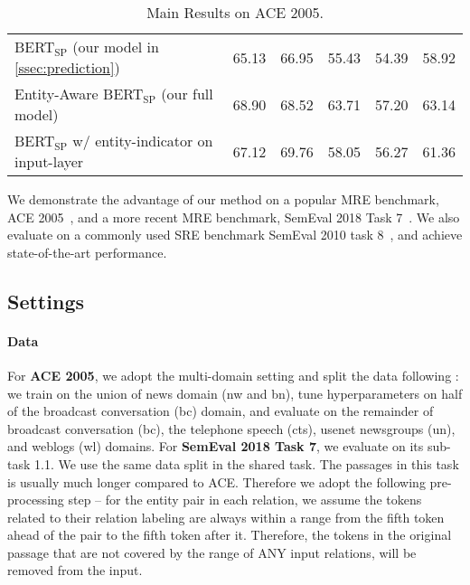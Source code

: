 \documentclass[11pt,a4paper]{article}
\begin{document}
\begin{table*}[!htbp]
\begin{tabular}{lccccc}
BERT$_{\textrm{SP}}$ (our model in \cref{ssec:prediction}) & 65.13 & 66.95 & 55.43 & 54.39 & 58.92 \\
Entity-Aware BERT$_{\textrm{SP}}$ (our full model)                                                    & 68.90        & 68.52          & {63.71} & 57.20          & 63.14          \\ 
BERT$_{\textrm{SP}}$ w/ entity-indicator on input-layer & 67.12        & 69.76          & 58.05          & 56.27          & 61.36          \\
\bottomrule
\end{tabular}
\vspace{-2mm}
\caption{Main Results on ACE 2005.}
\vspace{-2mm}
\label{tab:ace}
\end{table*}




We demonstrate the advantage of our method on a popular MRE benchmark, ACE 2005~\cite{walker2006ace}, and a more recent MRE benchmark, SemEval 2018 Task 7~\cite{gabor2018semeval}.
We also evaluate on a commonly used SRE benchmark SemEval 2010 task 8~\cite{hendrickx2009semeval}, and achieve state-of-the-art performance.
\subsection{Settings}

\paragraph{Data} For \textbf{ACE 2005}, we adopt the multi-domain setting and split the data following \cite{gormley2015improved}:
we train on the union of news domain (nw and bn), tune hyperparameters on half of the broadcast conversation (bc) domain, and evaluate on the remainder of broadcast conversation (bc), the telephone speech (cts), usenet newsgroups (un), and weblogs (wl) domains.
For \textbf{SemEval 2018 Task 7}, we evaluate on its sub-task 1.1.
We use the same data split in the shared task. 
The passages in this task is usually much longer compared to ACE. Therefore we adopt the following pre-processing step -- for the entity pair in each relation, we assume the tokens related to their relation labeling are always within a range from the fifth token ahead of the pair to the fifth token after it. Therefore, the tokens in the original passage that are not covered by the range of ANY input relations, will be removed from the input. 
\end{document}

